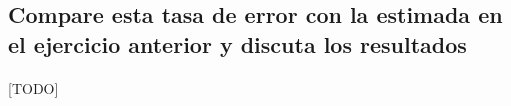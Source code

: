 \documentclass{article}
\begin{document}
		\subsection{Compare esta tasa de error con la estimada en el ejercicio anterior y discuta los resultados}

			\paragraph{}
			[TODO]
	\nocite{garciparedes:machine-learning-bayesian-1}
	\nocite{subject:taa}
	\nocite{tool:weka}
  
  
\end{document}
